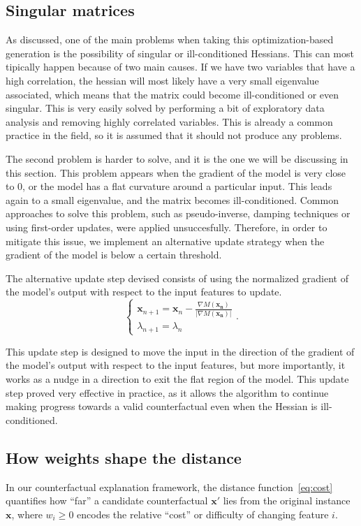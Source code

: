 \documentclass[12pt]{extarticle}
\numberwithin{equation}{section}
\begin{document}
\subsection{Singular matrices}\label{sec:singular}
As discussed, one of the main problems when taking this optimization-based generation is the possibility of singular or ill-conditioned Hessians. This can most tipically happen because of two main causes. If we have two variables that have a high correlation, the hessian  will most likely have a very small eigenvalue associated, which means that the matrix could become ill-conditioned or even singular. This is very easily solved by performing a bit of exploratory data analysis and removing highly correlated variables. This is already a common practice in the field, so it is assumed that it should not produce any problems.

The second problem is harder to solve, and it is the one we will be discussing in this section. This problem appears when the gradient of the model is very close to 0, or the model has a flat curvature around a particular input. This leads again to a small eigenvalue, and the matrix becomes ill-conditioned. Common approaches to solve this problem, such as pseudo-inverse, damping techniques or using first-order updates, were applied unsuccesfully. Therefore, in order to mitigate this issue, we implement an alternative update strategy when the gradient of the model is below a certain threshold. %

The alternative update step devised consists of using the normalized gradient of the model's output with respect to the input features to update. 
\[
    \begin{cases}
    \mathbf{x}_{n+1} = \mathbf{x}_n - \frac{\nabla M(\mathbf{x_n})}{|\nabla M(\mathbf{x_n})|}
    \\
    \lambda_{n+1} = \lambda_n
    \end{cases}.
\]

This update step is designed to move the input in the direction of the gradient of the model's output with respect to the input features, but more importantly, it works as a nudge in a direction to exit the flat region of the model. This update step proved very effective in practice, as it allows the algorithm to continue making progress towards a valid counterfactual even when the Hessian is ill-conditioned. 

\subsection{How weights shape the distance}\label{sec:weights}
In our counterfactual explanation framework, the distance function~\eqref{eq:cost} quantifies how “far” a candidate counterfactual \(\mathbf{x}'\) lies from the original instance \(\mathbf{x}\), where \(w_i \ge 0\) encodes the relative “cost” or difficulty of changing feature \(i\).
\end{document}
